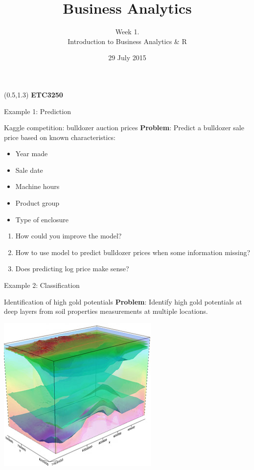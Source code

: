 \documentclass[14pt, handout]{beamer}
\title[Introduction to Business Analytics and R]{Business Analytics}
\author{Week 1.\\ Introduction to Business Analytics \& R}
\date{29 July 2015}
\begin{document}
\begin{frame}[plain]{}
\maketitle
\begin{textblock}{11}(0.5,1.3){\color{white}\large
\textbf{ETC3250}}
\end{textblock}

\end{frame}


\begin{frame}{Example 1: Prediction}\fontsize{13}{14}\sf

\begin{block}{Kaggle competition: bulldozer auction prices}
\textbf{Problem}: Predict a bulldozer sale price based on known characteristics:
\begin{itemize}
\item Year made
\item Sale date
\item Machine hours
\item Product group
\item Type of enclosure
\end{itemize}
\end{block}
\pause
\begin{enumerate}
\item How could you improve the model?
\item How to use model to predict bulldozer prices when some information missing?
\item Does predicting log price make sense?
\end{enumerate}


\end{frame}
\begin{frame}{Example 2: Classification}

\begin{block}{Identification of high gold potentials}
\textbf{Problem}: Identify high gold potentials at deep layers from soil properties measurements at multiple locations. 
\end{block}

\centerline{\includegraphics[scale=0.4]{../figures/layers.png}}

\end{frame}
\end{document}
